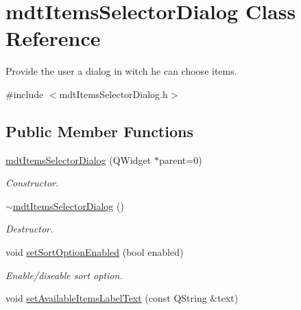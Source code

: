 \hypertarget{classmdt_items_selector_dialog}{
\section{mdtItemsSelectorDialog Class Reference}
\label{classmdt_items_selector_dialog}
}


Provide the user a dialog in witch he can choose items.  




{\ttfamily \#include $<$mdtItemsSelectorDialog.h$>$}

\subsection*{Public Member Functions}
\begin{DoxyCompactItemize}
\item 
\hyperlink{classmdt_items_selector_dialog_abfe9a59eba04870635aff550e16a1e5b}{mdtItemsSelectorDialog} (QWidget $\ast$parent=0)
\begin{DoxyCompactList}\small\item\em Constructor. \end{DoxyCompactList}\item 
\hypertarget{classmdt_items_selector_dialog_a88d371fd132aaa5c67896ffc5c208d57}{
\hyperlink{classmdt_items_selector_dialog_a88d371fd132aaa5c67896ffc5c208d57}{$\sim$mdtItemsSelectorDialog} ()}
\label{classmdt_items_selector_dialog_a88d371fd132aaa5c67896ffc5c208d57}

\begin{DoxyCompactList}\small\item\em Destructor. \end{DoxyCompactList}\item 
\hypertarget{classmdt_items_selector_dialog_a831eda8f00130744ac60d324d61f3687}{
void \hyperlink{classmdt_items_selector_dialog_a831eda8f00130744ac60d324d61f3687}{setSortOptionEnabled} (bool enabled)}
\label{classmdt_items_selector_dialog_a831eda8f00130744ac60d324d61f3687}

\begin{DoxyCompactList}\small\item\em Enable/diseable sort option. \end{DoxyCompactList}\item 
\hypertarget{classmdt_items_selector_dialog_a05cf055e72c2d86a2cc7eb92afdcddbb}{
void \hyperlink{classmdt_items_selector_dialog_a05cf055e72c2d86a2cc7eb92afdcddbb}{setAvailableItemsLabelText} (const QString \&text)}
\label{classmdt_items_selector_dialog_a05cf055e72c2d86a2cc7eb92afdcddbb}


\end{DoxyCompactItemize}
